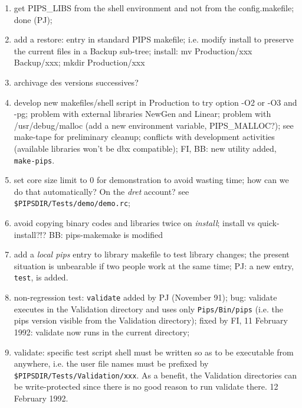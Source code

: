 \begin{enumerate}

  \item get PIPS\_LIBS from the shell environment and not from the
	config.makefile; done (PJ);

  \item add a restore: entry in standard PIPS makefile; i.e. modify install
	to preserve the current files in a Backup sub-tree; install:
	mv Production/xxx Backup/xxx; mkdir Production/xxx

  \item archivage des versions successives?

  \item develop new makefiles/shell script in Production to try option
	-O2 or -O3 and -pg; problem with external libraries NewGen and Linear;
	problem with /usr/debug/malloc (add a new environment variable,
	PIPS\_MALLOC?);
	see make-tape for preliminary cleanup; conflicts with
	development activities (available libraries won't be dbx
	compatible); FI, BB: new utility added, {\tt make-pips}.

  \item set core size limit to 0 for demonstration to avoid wasting time;
	how can we do that automatically? On the {\em dret} account? see
	\verb+$PIPSDIR/Tests/demo/demo.rc+;

  \item avoid copying binary codes and libraries twice on {\em install};
	install vs quick-install?!? BB: pips-makemake is modified

  \item add a {\em local pips} entry to library makefile to test library
	changes; the present situation is unbearable if two people work
	at the same time; PJ: a new entry, {\tt test}, is added.

  \item non-regression test: \verb+validate+ added by PJ (November 91);
	bug: validate executes in the Validation directory and
	uses only \verb+Pips/Bin/pips+ (i.e. the pips version visible
	from the Validation directory); fixed by FI, 11 February 1992:
	validate now runs in the current directory;

  \item validate: specific test script shell must be written so as
	to be executable from anywhere, i.e. the user file names must
	be prefixed by \verb+$PIPSDIR/Tests/Validation/xxx+. As a benefit,
	the Validation directories can be write-protected since there
	is no good reason to run validate there. 12 February 1992.


\end{enumerate}
